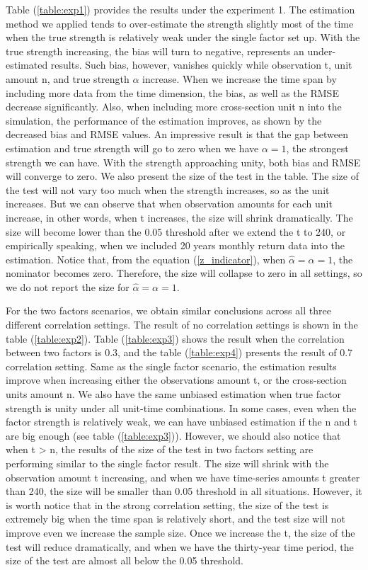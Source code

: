 Table (\ref{table:exp1}) provides the results under the experiment 1.
The estimation method we applied tends to over-estimate the strength slightly most of the time when the true strength is relatively weak under the single factor set up.
With the true strength increasing, the bias will turn to negative, represents an under-estimated results.
Such bias, however, vanishes quickly while observation t, unit amount n, and true strength $\alpha$ increase.
When we increase the time span by including more data from the time dimension, the bias, as well as the RMSE decrease significantly.
Also, when including more cross-section unit n into the simulation, the performance of the estimation improves, as shown by the decreased bias and RMSE values.
An impressive result is that the gap between estimation and true strength will go to zero when we have $\alpha = 1$, the strongest strength we can have.
With the strength approaching unity, both bias and RMSE will converge to zero.
We also present the size of the test in the table.
The size of the test will not vary too much when the strength increases, so as the unit increases.
But we can observe that when observation amounts for each unit increase, in other words, when t increases, the size will shrink dramatically.
The size will become lower than the 0.05 threshold after we extend the t to 240, or empirically speaking, when we included 20 years monthly return data into the estimation.
Notice that, from the equation (\ref{z_indicator}), when $\hat{\alpha} = \alpha = 1$, the nominator becomes zero.
Therefore, the size will collapse to zero in all settings, so we do not report the size for $\hat{\alpha} = \alpha = 1$.

For the two factors scenarios, we obtain similar conclusions across all three different correlation settings.
The result of no correlation settings is shown in the table (\ref{table:exp2}). 
Table (\ref{table:exp3}) shows the result when the correlation between two factors is 0.3, and the table (\ref{table:exp4}) presents the result of 0.7 correlation setting.
Same as the single factor scenario, the estimation results improve when increasing either the observations amount t, or the cross-section units amount n.
We also have the same unbiased estimation when true factor strength is unity under all unit-time combinations.
In some cases, even when the factor strength is relatively weak, we can have unbiased estimation if the n and t are big enough (see table (\ref{table:exp3})).
However, we should also notice that when t > n, the results of the size of the test in two factors setting are performing similar to the single factor result. 
The size will shrink with the observation amount t increasing, and when we have time-series amounts t greater than 240, the size will be smaller than 0.05 threshold in all situations.
However, it is worth notice that in the strong correlation setting, the size of the test is extremely big when the time span is relatively short, and the test size will not improve even we increase the sample size.
Once we increase the t, the size of the test will reduce dramatically, and when we have the thirty-year time period, the size of the test are almost all below the 0.05 threshold.

